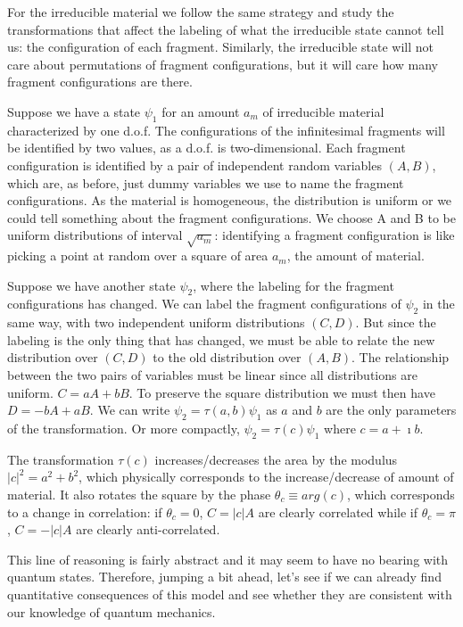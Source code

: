 \documentclass[smallextended]{svjour3}
\numberwithin{equation}{section}
\begin{document}
For the irreducible material we follow the same strategy and study the transformations that affect the labeling of what the irreducible state cannot tell us: the configuration of each fragment. Similarly, the irreducible state will not care about permutations of fragment configurations, but it will care how many fragment configurations are there.

Suppose we have a state $\psi_1$ for an amount $a_m$ of irreducible material characterized by one d.o.f. The configurations of the infinitesimal fragments will be identified by two values, as a d.o.f. is two-dimensional. Each fragment configuration is identified by a pair of independent random variables $(A, B)$, which are, as before, just dummy variables we use to name the fragment configurations. As the material is homogeneous, the distribution is uniform or we could tell something about the fragment configurations. We choose A and B to be uniform distributions of interval $\sqrt{a_m}$: identifying a fragment configuration is like picking a point at random over a square of area $a_m$, the amount of material.

Suppose we have another state $\psi_2$, where the labeling for the fragment configurations has changed. We can label the fragment configurations of $\psi_2$ in the same way, with two independent uniform distributions $(C, D)$. But since the labeling is the only thing that has changed, we must be able to relate the new distribution over $(C,D)$ to the old distribution over $(A,B)$. The relationship between the two pairs of variables must be linear since all distributions are uniform. $C=aA+bB$. To preserve the square distribution we must then have $D= -bA + aB$. We can write $\psi_2 = \tau(a,b) \psi_1$ as $a$ and $b$ are the only parameters of the transformation. Or more compactly, $\psi_2 = \tau(c) \psi_1$ where $c=a+\imath b$.

The transformation $\tau(c)$ increases/decreases the area by the modulus $|c|^2=a^2+b^2$, which physically corresponds to the increase/decrease of amount of material. It also rotates the square by the phase $\theta_c \equiv arg(c)$, which corresponds to a change in correlation: if $\theta_c = 0$, $C = |c| A$ are clearly correlated while if $\theta_c = \pi$, $C = - |c| A$ are clearly anti-correlated.

This line of reasoning is fairly abstract and it may seem to have no bearing with quantum states. Therefore, jumping a bit ahead, let's see if we can already find quantitative consequences of this model and see whether they are consistent with our knowledge of quantum mechanics.
\end{document}

